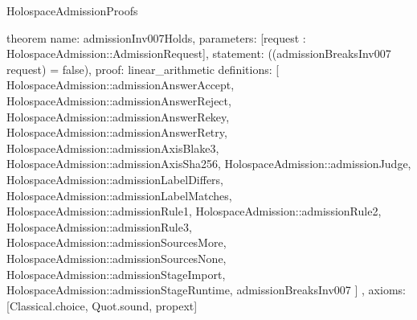 \begin{lexlean}{HolospaceAdmissionProofs}
\begin{semanticmodule}
theorem{
  name: admissionInv007Holds,
  parameters: [request : HolospaceAdmission::AdmissionRequest],
  statement: ((admissionBreaksInv007 request) = false),
  proof: linear_arithmetic{
    definitions: [
      HolospaceAdmission::admissionAnswerAccept,
      HolospaceAdmission::admissionAnswerReject,
      HolospaceAdmission::admissionAnswerRekey,
      HolospaceAdmission::admissionAnswerRetry,
      HolospaceAdmission::admissionAxisBlake3,
      HolospaceAdmission::admissionAxisSha256,
      HolospaceAdmission::admissionJudge,
      HolospaceAdmission::admissionLabelDiffers,
      HolospaceAdmission::admissionLabelMatches,
      HolospaceAdmission::admissionRule1,
      HolospaceAdmission::admissionRule2,
      HolospaceAdmission::admissionRule3,
      HolospaceAdmission::admissionSourcesMore,
      HolospaceAdmission::admissionSourcesNone,
      HolospaceAdmission::admissionStageImport,
      HolospaceAdmission::admissionStageRuntime,
      admissionBreaksInv007
    ]
  },
  axioms: [Classical.choice, Quot.sound, propext]
}
\end{semanticmodule}
\end{lexlean}
